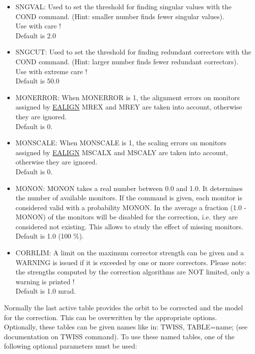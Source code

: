 \begin{itemize}
   \item SNGVAL:  Used to set the threshold for finding singular values
     with the COND command. (Hint: smaller number finds fewer singular
     values).  
     \\ Use with care ! 
     \\ Default is 2.0 

   \item SNGCUT:  Used to set the threshold for finding redundant
     correctors with the COND command. (Hint: larger number finds fewer
     redundant correctors).  
     \\ Use with extreme care ! 
     \\ Default is 50.0 

   \item MONERROR: When MONERROR is 1, the alignment errors on monitors
     assigned  by \href{../error/error_align.html}{EALIGN} MREX and MREY
     are taken into account, otherwise they are ignored.  
     \\ Default is 0. 

   \item MONSCALE: When MONSCALE is 1, the scaling errors on monitors
     assigned  by \href{../error/error_align.html}{EALIGN} MSCALX and
     MSCALY are taken into account, otherwise they are ignored.  
     \\ Default is 0. 

   \item MONON: MONON takes a real number between 0.0 and 1.0. It
     determines the number of available monitors. If the command is
     given, each monitor is considered valid with a probability
     MONON. In the average a fraction (1.0 - MONON) of the monitors will
     be disabled for the correction, i.e. they are considered  not
     existing.  This allows to study the effect of missing monitors.  
     \\ Default is 1.0 (100 \%). 

   \item CORRLIM:  A limit on the maximum corrector strength can be
     given and a WARNING is issued if it is exceeded by one or more
     correctors.  Please note: the strengths computed by the correction
     algorithms are NOT limited, only a warning is printed ! 
     \\ Default is 1.0 mrad. \\
\end{itemize}

Normally the last active table provides the orbit to be
corrected and the model for the correction. This can be overwritten
by the appropriate options. Optionally, these tables can be given
names like in:  TWISS, TABLE=name; (see documentation on TWISS
command). To use these named tables, one of the following optional
parameters must be  used:  

